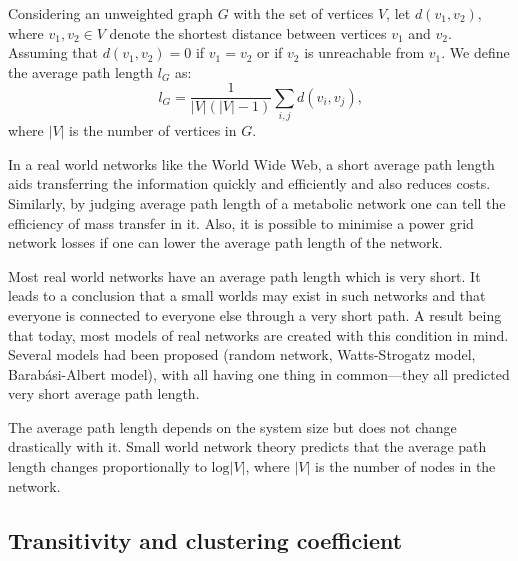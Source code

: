       Considering an unweighted graph $G$ with the set of vertices $V$, let $d(v_1, v_2)$, where $v_1, v_2 \in V$ denote the shortest distance between vertices $v_1$ and $v_2$. Assuming that $d(v_1, v_2) = 0$ if $v_1 = v_2$ or if $v_2$ is unreachable from $v_1$. We define the average path length $l_G$ as:
      \begin{equation}
        l_G = \frac{1}{|V| (|V| - 1)} \sum_{i, j} d(v_i, v_j) \mbox{,}
      \end{equation}
      where $|V|$ is the number of vertices in $G$.
      
      In a real world networks like the World Wide Web, a short average path length aids transferring the information quickly and efficiently and also reduces costs. Similarly, by judging average path length of a metabolic network one can tell the efficiency of mass transfer in it. Also, it is possible to minimise a power grid network losses if one can lower the average path length of the network.

      Most real world networks have an average path length which is very short. It leads to a conclusion that a small worlds may exist in such networks and that everyone is connected to everyone else through a very short path. A result being that today, most models of real networks are created with this condition in mind. Several models had been proposed (random network, Watts-Strogatz model, Barabási-Albert model), with all having one thing in common---they all predicted very short average path length\cite{BarabasiAlbert2002}.

      The average path length depends on the system size but does not change drastically with it. Small world network theory predicts that the average path length changes proportionally to $\mbox{log} |V|$, where $|V|$ is the number of nodes in the network.

    \subsection{Transitivity and clustering coefficient}


